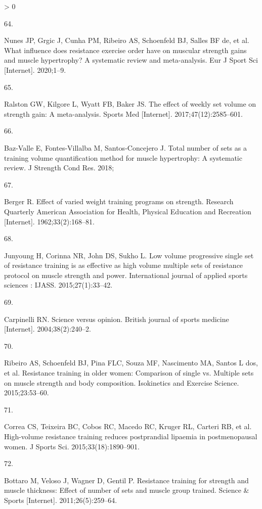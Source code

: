 \documentclass[twoside,10pt]{gihclass} %
\newlength{\cslhangindent}
\newlength{\csllabelwidth}
\newenvironment{CSLReferences}[3] %
 {%
  \setlength{\parindent}{0pt}
  \ifodd #1 \everypar{\setlength{\hangindent}{\cslhangindent}}\ignorespaces\fi
  \ifnum #2 > 0
  \setlength{\parskip}{#2\baselineskip}
  \fi
 }%
 {}
\newcommand{\CSLLeftMargin}[1]{\parbox[t]{\maxof{\widthof{#1}}{\csllabelwidth}}{#1}}
\newcommand{\CSLRightInline}[1]{\parbox[t]{\linewidth}{#1}}
\begin{document}
\begin{CSLReferences}{0}{0}
\leavevmode\hypertarget{ref-RN2591}{}%
\CSLLeftMargin{64. }
\CSLRightInline{Nunes JP, Grgic J, Cunha PM, Ribeiro AS, Schoenfeld BJ, Salles BF de, et al. What influence does resistance exercise order have on muscular strength gains and muscle hypertrophy? A systematic review and meta-analysis. Eur J Sport Sci {[}Internet{]}. 2020;1--9. }

\leavevmode\hypertarget{ref-RN2492}{}%
\CSLLeftMargin{65. }
\CSLRightInline{Ralston GW, Kilgore L, Wyatt FB, Baker JS. The effect of weekly set volume on strength gain: A meta-analysis. Sports Med {[}Internet{]}. 2017;47(12):2585--601. }

\leavevmode\hypertarget{ref-RN2130}{}%
\CSLLeftMargin{66. }
\CSLRightInline{Baz-Valle E, Fontes-Villalba M, Santos-Concejero J. Total number of sets as a training volume quantification method for muscle hypertrophy: A systematic review. J Strength Cond Res. 2018; }

\leavevmode\hypertarget{ref-RN1476}{}%
\CSLLeftMargin{67. }
\CSLRightInline{Berger R. Effect of varied weight training programs on strength. Research Quarterly American Association for Health, Physical Education and Recreation {[}Internet{]}. 1962;33(2):168--81. }

\leavevmode\hypertarget{ref-RN2568}{}%
\CSLLeftMargin{68. }
\CSLRightInline{Junyoung H, Corinna NR, John DS, Sukho L. Low volume progressive single set of resistance training is as effective as high volume multiple sets of resistance protocol on muscle strength and power. International journal of applied sports sciences : IJASS. 2015;27(1):33--42. }

\leavevmode\hypertarget{ref-RN2201}{}%
\CSLLeftMargin{69. }
\CSLRightInline{Carpinelli RN. Science versus opinion. British journal of sports medicine {[}Internet{]}. 2004;38(2):240--2. }

\leavevmode\hypertarget{ref-RN2465}{}%
\CSLLeftMargin{70. }
\CSLRightInline{Ribeiro AS, Schoenfeld BJ, Pina FLC, Souza MF, Nascimento MA, Santos L dos, et al. Resistance training in older women: Comparison of single vs. Multiple sets on muscle strength and body composition. Isokinetics and Exercise Science. 2015;23:53--60. }

\leavevmode\hypertarget{ref-RN2464}{}%
\CSLLeftMargin{71. }
\CSLRightInline{Correa CS, Teixeira BC, Cobos RC, Macedo RC, Kruger RL, Carteri RB, et al. High-volume resistance training reduces postprandial lipaemia in postmenopausal women. J Sports Sci. 2015;33(18):1890--901. }

\leavevmode\hypertarget{ref-RN2463}{}%
\CSLLeftMargin{72. }
\CSLRightInline{Bottaro M, Veloso J, Wagner D, Gentil P. Resistance training for strength and muscle thickness: Effect of number of sets and muscle group trained. Science \& Sports {[}Internet{]}. 2011;26(5):259--64. }


\end{CSLReferences}
\end{document}
